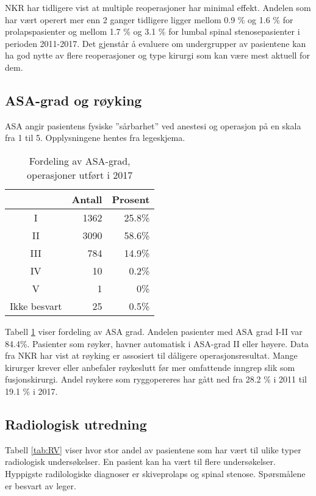 \documentclass [norsk,a4paper,twoside]{article}\usepackage[]{graphicx}\usepackage[]{color}
\begin{document}
NKR har tidligere vist at multiple reoperasjoner har minimal effekt. Andelen som har vært operert 
mer enn 2 ganger tidligere ligger mellom 0.9 \%
og 1.6 \% for prolapspasienter og mellom 1.7 \%
og 3.1 \% for lumbal spinal stenosepasienter i perioden 2011-2017. 
Det gjenstår å evaluere om undergrupper av pasientene kan ha god nytte av flere reoperasjoner og type kirurgi som kan være mest aktuell for dem.


\subsection{ASA-grad og røyking}
ASA angir pasientens fysiske ”sårbarhet” ved anestesi og operasjon på en skala fra 1 til 5. 
Opplysningene hentes fra legeskjema.
\begin{table}[ht]
\centering
\begin{tabular}{crr}
  \hline
 & Antall & Prosent \\ 
  \hline
I & 1362 & 25.8\% \\ 
  II & 3090 & 58.6\% \\ 
  III & 784 & 14.9\% \\ 
  IV & 10 & 0.2\% \\ 
  V & 1 & 0\% \\ 
  Ikke besvart & 25 & 0.5\% \\ 
   \hline
\end{tabular}
\caption{Fordeling av ASA-grad, operasjoner utført i 2017} 
\label{tab:ASA}
\end{table}


Tabell \ref{tab:ASA} viser fordeling av ASA grad. Andelen pasienter med ASA grad I-II 
var 84.4\%. Pasienter som røyker, havner 
automatisk i ASA-grad II eller høyere. Data fra NKR har vist at røyking er assosiert til dåligere operasjonsresultat.
Mange kirurger krever eller anbefaler røykeslutt før mer omfattende inngrep slik som fusjonskirurgi.
Andel røykere som ryggopereres har gått ned fra 28.2 \% i 2011 til 19.1 \% i 2017. 



\subsection{Radiologisk utredning}

Tabell \ref{tab:RV} viser hvor stor andel av pasientene som har vært til ulike typer 
radiologisk undersøkelser. En pasient kan ha vært til flere undersøkelser. Hyppigste radilologiske diagnoser er skiveprolaps og spinal stenose.
Spørsmålene er besvart av leger. 
\end{document}
